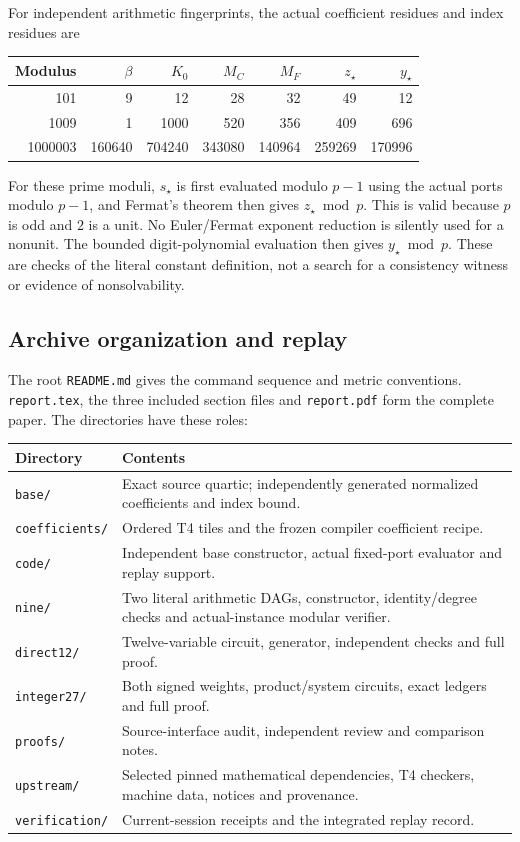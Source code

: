 \documentclass[11pt,a4paper]{article}
\theoremstyle{remark}
\begin{document}
For independent arithmetic fingerprints, the actual coefficient residues
and index residues are
\begin{center}
\small
\begin{tabular}{@{}rrrrrrr@{}}
\toprule
Modulus & $\beta$ & $K_0$ & $M_C$ & $M_F$ & $z_\star$ & $y_\star$\\\midrule
101 & 9 & 12 & 28 & 32 & 49 & 12\\
1009 & 1 & 1000 & 520 & 356 & 409 & 696\\
1000003 & 160640 & 704240 & 343080 & 140964 & 259269 & 170996\\
\bottomrule
\end{tabular}
\end{center}
For these prime moduli, $s_\star$ is first evaluated modulo $p-1$
using the actual ports modulo $p-1$, and Fermat's theorem then gives
$z_\star\bmod p$.  This is valid because $p$ is odd and $2$ is a unit.
No Euler/Fermat exponent reduction is silently used for a nonunit.
The bounded digit-polynomial evaluation then gives $y_\star\bmod p$.
These are checks of the literal constant definition, not a search for
a consistency witness or evidence of nonsolvability.

\subsection{Archive organization and replay}

The root \texttt{README.md} gives the command sequence and metric
conventions.  \texttt{report.tex}, the three included section files and
\texttt{report.pdf} form the complete paper.  The directories have these
roles:
\begin{center}
\begin{tabular}{@{}lp{10.2cm}@{}}
\toprule
Directory & Contents\\\midrule
\texttt{base/} & Exact source quartic; independently generated normalized coefficients and index bound.\\
\texttt{coefficients/} & Ordered T4 tiles and the frozen compiler coefficient recipe.\\
\texttt{code/} & Independent base constructor, actual fixed-port evaluator and replay support.\\
\texttt{nine/} & Two literal arithmetic DAGs, constructor, identity/degree checks and actual-instance modular verifier.\\
\texttt{direct12/} & Twelve-variable circuit, generator, independent checks and full proof.\\
\texttt{integer27/} & Both signed weights, product/system circuits, exact ledgers and full proof.\\
\texttt{proofs/} & Source-interface audit, independent review and comparison notes.\\
\texttt{upstream/} & Selected pinned mathematical dependencies, T4 checkers, machine data, notices and provenance.\\
\texttt{verification/} & Current-session receipts and the integrated replay record.\\
\bottomrule
\end{tabular}
\end{center}
\end{document}
